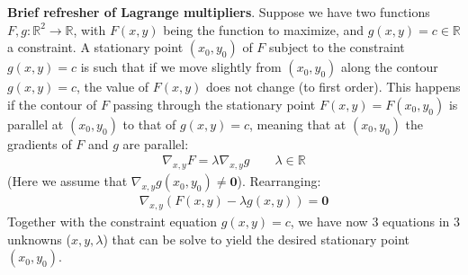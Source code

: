 \documentclass[../template.tex]{subfiles}
\begin{document}
\begin{expl}\textbf{Brief refresher of Lagrange multipliers}. Suppose we have two functions $F, g\colon \mathbb{R}^2 \to \mathbb{R}$, with $F(x,y)$ being the function to maximize, and $g(x,y) = c \in \mathbb{R}$ a constraint. A stationary point $(x_0,y_0)$ of $F$ subject to the constraint $g(x,y) = c$ is such that if we move slightly from $(x_0,y_0)$ along the contour $g(x,y) = c$, the value of $F(x,y)$ does not change (to first order). This happens if the contour of $F$ passing through the stationary point $F(x,y) = F(x_0, y_0)$ is parallel at $(x_0,y_0)$ to that of $g(x,y) = c$, meaning that at $(x_0, y_0)$ the gradients of $F$ and $g$ are parallel:
\begin{align*}
    \nabla_{x,y} F = \lambda \nabla_{{x,y}} g \qquad \lambda \in \mathbb{R}
\end{align*}
(Here we assume that $\nabla_{x,y} g (x_0,y_0) \neq \bm{0}$). Rearranging:
\begin{align*}
    \nabla_{x,y} (F(x,y) - \lambda g(x,y)) = \bm{0}
\end{align*}
Together with the constraint equation $g(x,y) = c$, we have now $3$ equations in $3$ unknowns ($x,y,\lambda$) that can be solve to yield the desired stationary point $(x_0, y_0)$.
\end{expl}
\end{document}
